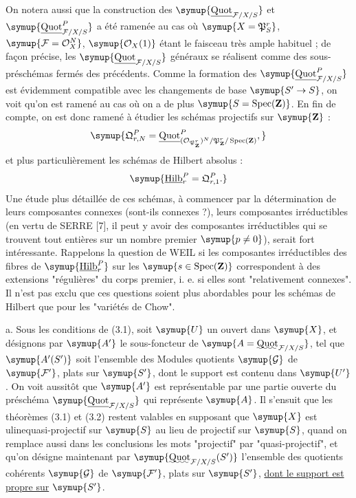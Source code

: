  On notera aussi que la construction des
$\symup{\underline{\operatorname{Quot}}_{\mathcal F/X/S}}$ et
$\symup{\underline{\operatorname{Quot}}^P_{\mathcal F/X/S}}$ a été ramenée au cas où
$\symup{X=\mathfrak P^r_S}$, $\symup{\mathcal F=\mathcal O_X^N}$, $\symup{\mathcal O_X(1)}$ étant le
faisceau très ample habituel ; de façon précise, les
$\symup{\underline{\operatorname{Quot}}_{\mathcal F/X/S}}$ généraux se réalisent comme des
sous-préschémas fermés des précédents. Comme la formation des
$\symup{\underline{\operatorname{Quot}}^P_{\mathcal F/X/S}}$ est évidemment compatible avec les
changements de base $\symup{S'\to S}$, on voit qu'on est ramené au cas où
on a de plus $\symup{S=\operatorname{Spec}(\mathbf Z)}$. En fin de compte, on est donc
ramené à étudier les schémas projectifs sur $\symup{\mathbf Z}$ :
\[
\symup{\mathfrak Q^P_{r,N}=
\underline{\operatorname{Quot}}^{P}_{(\mathcal O_{\mathfrak P^r_{\mathbf Z}})^N/
\mathfrak P^r_{\mathbf Z}/\operatorname{Spec}(\mathbf Z)},}
\]
et plus particulièrement les schémas de Hilbert absolus :
\[
\symup{\underline{\operatorname{Hilb}}^P_r=\mathfrak Q^P_{r,1}.}
\]
Une étude plus détaillée de ces schémas, à commencer par la détermination de
leurs composantes connexes (sont-ils connexes ?), leurs composantes irréductibles (en
vertu de SERRE [7], il peut y avoir des composantes irréductibles qui se
trouvent tout entières sur un nombre premier $\symup{p\neq0}$), serait fort
intéressante. Rappelons la question de WEIL si les composantes irréductibles des
fibres de $\symup{\underline{\operatorname{Hilb}}^P_r}$ sur les
$\symup{s\in\operatorname{Spec}(\mathbf Z)}$ correspondent à des extensions
"régulières" du corps premier, i. e. si elles sont "relativement connexes".
Il n'est pas exclu que ces questions soient plus abordables pour les schémas de
Hilbert que pour les "variétés de Chow".


\noindent a. Sous les conditions de (3.1), soit $\symup{U}$ un ouvert dans $\symup{X}$, et
désignons par $\symup{A'}$ le sous-foncteur de
$\symup{A=\mathop{\text{\uwave{Quot}}}\nolimits_{\mathcal F/X/S}}$, tel que $\symup{A'(S')}$ soit
l'ensemble des Modules quotients $\symup{\mathcal G}$ de $\symup{\mathcal F'}$, plats sur
$\symup{S'}$, dont le support est contenu dans $\symup{U'}$. On voit aussitôt que $\symup{A'}$ est
représentable par une partie ouverte du préschéma
$\symup{\underline{\operatorname{Quot}}_{\mathcal F/X/S}}$ qui représente $\symup{A}$. Il s'ensuit que les
théorèmes (3.1) et (3.2)
restent valables en supposant que $\symup{X}$ est \\uline{quasi-projectif} sur $\symup{S}$ au lieu de
projectif sur $\symup{S}$, quand on remplace aussi dans les conclusions les mots
"projectif" par "quasi-projectif", et qu'on désigne maintenant par
$\symup{\mathop{\text{\uwave{Quot}}}\nolimits_{\mathcal F/X/S}(S')}$ l'ensemble des
quotients cohérents $\symup{\mathcal G}$ de $\symup{\mathcal F'}$, plats sur $\symup{S'}$, \uline{dont le support est propre sur} $\symup{S'}$.

